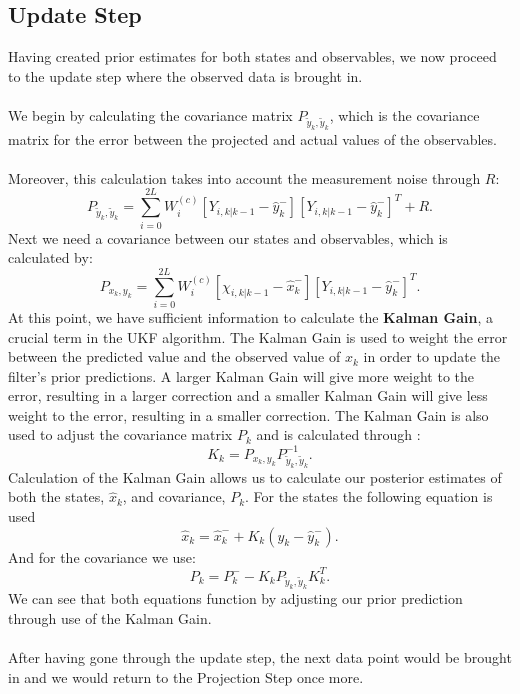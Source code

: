 \documentclass{article}
\begin{document}
    \subsection{Update Step}
    Having created prior estimates for both states and observables, we now proceed to the update step where the observed data is brought in. \cite{VanMereChapter} \\
    \\
    We begin by calculating the covariance matrix $P_{\tilde{y}_k, \tilde{y}_k}$, which is the covariance matrix for the error between the projected and actual values of the observables. \\
    \\
    Moreover, this calculation takes into account the measurement noise through $R$:
    \begin{equation}
    P_{\tilde{y}_k, \tilde{y}_k} = \sum_{i=0}^{2L} W_i^{(c)} [Y_{i,k|k-1} - \hat{y}_k^-][Y_{i,k|k-1} - \hat{y}_k^-]^T + R. 
    \end{equation}
    Next we need a covariance between our states and observables, which is calculated by:
    \begin{equation}
    P_{{x}_k,{y}_k} = \sum_{i=0}^{2L} W_i^{(c)} [\chi_{i,k|k-1} - \hat{x}_k^-][Y_{i,k|k-1} - \hat{y}_k^-]^T.
    \end{equation}
    At this point, we have sufficient information to calculate the \textbf{Kalman Gain}, a crucial term in the UKF algorithm. The Kalman Gain is used to weight the error between the predicted value and the observed value of $x_k$ in order to update the filter's prior predictions. A larger Kalman Gain will give more weight to the error, resulting in a larger correction and a smaller Kalman Gain will give less weight to the error, resulting in a smaller correction. The Kalman Gain is also used to adjust the covariance matrix $P_k$ and is calculated through \cite{VanMereChapter}:
    \begin{equation}
    K_k = P_{x_k, y_k} P_{\tilde{y}_k, \tilde{y}_k}^{-1}. 
    \end{equation}
    Calculation of the Kalman Gain allows us to calculate our posterior estimates of both the states, $\hat{x}_k$, and covariance, $P_k$.\cite{VanMereChapter} For the states the following equation is used
    \begin{equation}
    \hat{x}_k = \hat{x}_k^- + K_k(y_k - \hat{y}_k^-). 
    \end{equation}
    And for the covariance we use:
    \begin{equation} \label{eq:27ukf}
    P_k = P_k^-  - K_k P_{\tilde{y}_k, \tilde{y}_k} K_k^T.
    \end{equation}
    We can see that both equations function by adjusting our prior prediction through use of the Kalman Gain.\\
    \\
    After having gone through the update step, the next data point would be brought in and we would return to the Projection Step once more.
\end{document}
